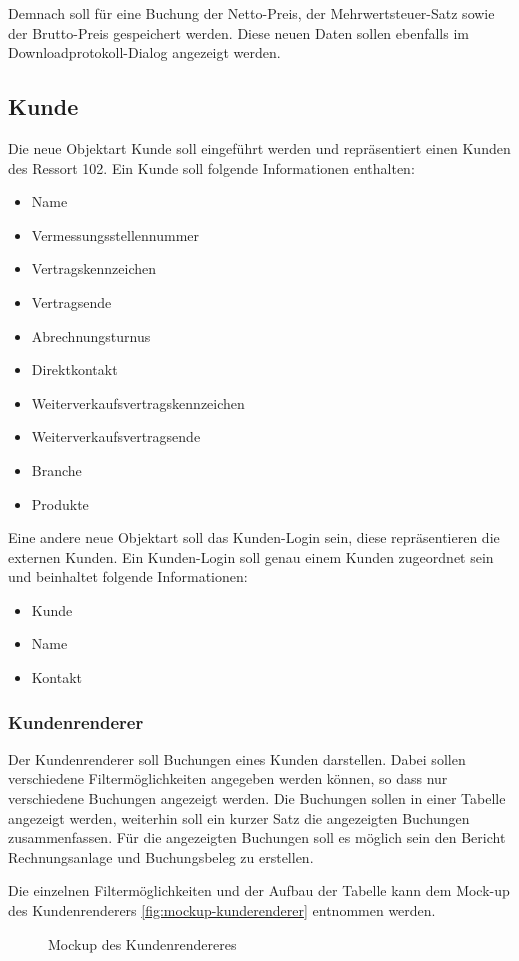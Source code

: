 Demnach soll für eine Buchung der Netto-Preis, der Mehrwertsteuer-Satz sowie der Brutto-Preis gespeichert werden. Diese neuen Daten sollen ebenfalls im Downloadprotokoll-Dialog angezeigt werden.
\subsection{Kunde}
Die neue Objektart Kunde soll eingeführt werden und repräsentiert einen Kunden des Ressort 102.
Ein Kunde soll folgende Informationen enthalten:
\begin{itemize}
\item Name
\item Vermessungsstellennummer
\item Vertragskennzeichen
\item Vertragsende
\item Abrechnungsturnus
\item Direktkontakt
\item Weiterverkaufsvertragskennzeichen
\item Weiterverkaufsvertragsende
\item Branche
\item Produkte
\end{itemize}
Eine andere neue Objektart soll das Kunden-Login sein, diese repräsentieren die externen Kunden. Ein Kunden-Login soll genau einem Kunden zugeordnet sein und beinhaltet folgende Informationen:
\begin{itemize}
\item Kunde
\item Name
\item Kontakt
\end{itemize}
\subsubsection{Kundenrenderer}
Der Kundenrenderer soll Buchungen eines Kunden darstellen.
Dabei sollen verschiedene Filtermöglichkeiten angegeben werden können, so dass nur verschiedene Buchungen angezeigt werden.
Die Buchungen sollen in einer Tabelle angezeigt werden, weiterhin soll ein kurzer Satz die angezeigten Buchungen zusammenfassen.
Für die angezeigten Buchungen soll es möglich sein den Bericht Rechnungsanlage und Buchungsbeleg zu erstellen.

Die einzelnen Filtermöglichkeiten und der Aufbau der Tabelle kann dem Mock-up des Kundenrenderers \vref{fig:mockup-kunderenderer} entnommen werden.

\begin{figure}[htbp]
	\centering
	\caption{Mockup des Kundenrendereres}
	\label{fig:mockup-kunderenderer}
\end{figure}


